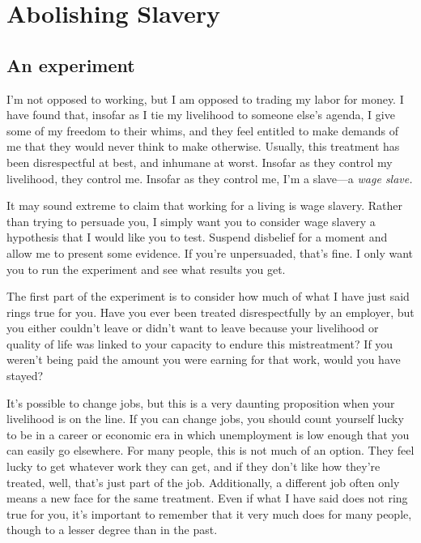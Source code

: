 \chapter{Abolishing Slavery}

\section{An experiment}
I'm not opposed to working, but I am opposed to trading my labor for money. I have found that, insofar as I tie my livelihood to someone else's agenda, I give some of my freedom to their whims, and they feel entitled to make demands of me that they would never think to make otherwise. Usually, this treatment has been disrespectful at best, and inhumane at worst. Insofar as they control my livelihood, they control me. Insofar as they control me, I'm a slave---a \emph{wage slave.}

It may sound extreme to claim that working for a living is wage slavery. Rather than trying to persuade you, I simply want you to consider wage slavery a hypothesis that I would like you to test. Suspend disbelief for a moment and allow me to present some evidence. If you're unpersuaded, that's fine. I only want you to run the experiment and see what results you get.

The first part of the experiment is to consider how much of what I have just said rings true for you. Have you ever been treated disrespectfully by an employer, but you either couldn't leave or didn't want to leave because your livelihood or quality of life was linked to your capacity to endure this mistreatment? If you weren't being paid the amount you were earning for that work, would you have stayed?

It's possible to change jobs, but this is a very daunting proposition when your livelihood is on the line. If you can change jobs, you should count yourself lucky to be in a career or economic era in which unemployment is low enough that you can easily go elsewhere. For many people, this is not much of an option. They feel lucky to get whatever work they can get, and if they don't like how they're treated, well, that's just part of the job. Additionally, a different job often only means a new face for the same treatment. Even if what I have said does not ring true for you, it's important to remember that it very much does for many people, though to a lesser degree than in the past.

